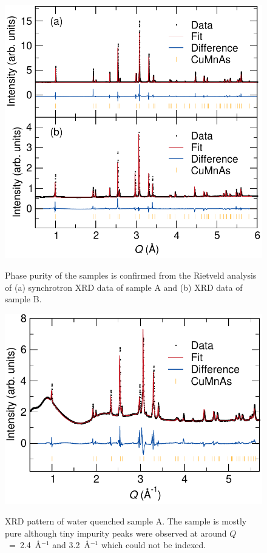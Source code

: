 \documentclass[10pt,doublespacing,edeposit]{uiucthesis2020}
\begin{document}
\begin{mainmatter}
\begin{figure}[h]
\centering\includegraphics[width=0.7\columnwidth]{figures/ch7/suppl_XRD_data_cropped.pdf} \\
\caption{\label{fig:XRD_data}
Phase purity of the samples is confirmed from the Rietveld analysis of (a) synchrotron XRD data of sample A and (b) XRD data of sample B. %
} 
\end{figure}


\begin{figure}[h]
\centering\includegraphics[width=0.7\columnwidth]{figures/ch7/suppl_quenched_samples_A_cropped.pdf} \\
\caption{\label{fig:quenched_sample_A}
XRD pattern of water quenched sample A. The sample is mostly pure although tiny impurity peaks were observed at around $Q$~=~2.4~\AA$^{-1}$ and 3.2~\AA$^{-1}$ which could not be indexed.
} 
\end{figure}



\end{mainmatter}
\end{document}
